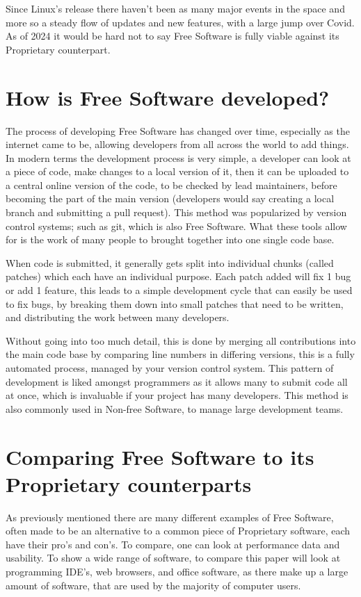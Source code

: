 \documentclass[a4paper,12pt]{article}
\begin{document}
{Since Linux's release there haven't been as many major events in the space and more so a steady flow
of updates and new features, with a large jump over Covid. As of 2024 it would be hard not to 
say Free Software is fully viable against its Proprietary counterpart.

\section{How is Free Software developed?}
The process of developing Free Software has changed over time, especially as the internet came to be,
allowing developers from all across the world to add things. In modern terms the development process is 
very simple, a developer can look at a piece of code, make changes to a local version of it, then it 
can be uploaded to a central online version of the code, to be checked by lead maintainers, before becoming
the part of the main version (developers would say creating a local branch and submitting a pull request). 
This method was popularized by version control systems; such as git\cite{GIT}, which is also Free Software. 
What these tools allow for is the work of many people to brought together into one single code base.

When code is submitted, it generally gets split into individual chunks (called patches) which each
have an individual purpose. Each patch added will fix 1 bug or add 1 feature, this leads to a simple
development cycle that can easily be used to fix bugs, by breaking them down into small patches that
need to be written, and distributing the work between many developers. 

Without going into too much detail, this is done by merging all contributions into the main code base
by comparing line numbers in differing versions, this is a fully automated process, managed by your
version control system. This pattern of development is liked amongst programmers as it allows many 
to submit code all at once, which is invaluable if your project has many developers. This method
is also commonly used in Non-free Software, to manage large development teams\cite{NONFREEvcs}.

\section{Comparing Free Software to its Proprietary counterparts}
As previously mentioned there are many different examples of Free Software, often made to be an 
alternative to a common piece of Proprietary software, each have their pro's and con's. To compare,
one can look at performance data and usability. To show a wide range of software, to compare this paper 
will look at programming IDE's, web browsers, and office software, as there make up a large amount 
of software, that are used by the majority of computer users.

}
\end{document}
